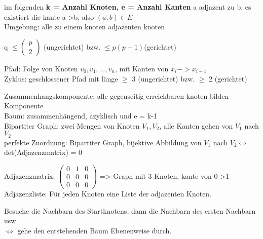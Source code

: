 im folgenden \textbf{k = Anzahl Knoten, e = Anzahl Kanten}
a adjazent zu b: es existiert die kante a->b, also $(a,b) \in E$\\
Umgebung: alle zu einem knoten adjazenten knoten

q $\leq \left( \begin{array}{c}p \\ 2\end{array} \right)$ (ungerichtet) bzw. $\leq p(p-1)$(gerichtet)




Pfad: Folge von Knoten $v_0,v_1,\dots,v_n$, mit Kanten von $x_i -> x_{i+1}$\\
Zyklus: geschlossener Pfad mit länge $\geq$ 3 (ungerichtet) bzw. $\geq$ 2 (gerichtet)

Zusammenhangskomponente: alle gegenseitig erreichbaren knoten bilden Komponente\\
Baum: zusammenhängend, azyklisch und e = k-1\\
Bipartiter Graph: zwei Mengen von Knoten $V_1, V_2$, alle Kanten gehen von $V_1$ nach $V_2$\\
perfekte Zuordnung: Bipartiter Graph, bijektive Abbildung von $V_1$ nach $V_2 \Leftrightarrow$ det(Adjazenzmatrix) = 0

Adjazenzmatrix: $\left(
\begin{matrix}
0 & 1& 0\\
0 & 0 & 0 \\
0 & 0 & 0 
\end{matrix}
 \right)$ => Graph mit 3 Knoten, kante von 0->1\\
Adjazenzliste: Für jeden Knoten eine Liste der adjazenten  Knoten.

Besuche die Nachbarn des Startknotens, dann die Nachbarn des ersten Nachbarn usw.\\
$\Leftrightarrow$ gehe den entstehenden Baum Ebenenweise durch.

